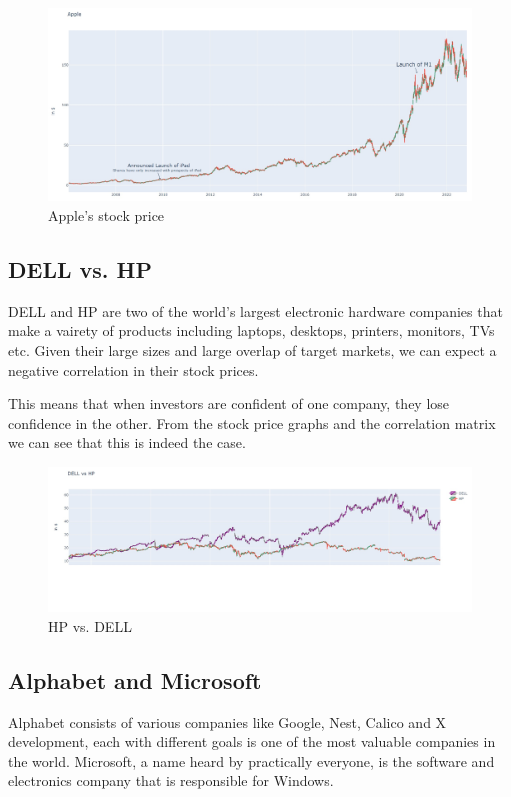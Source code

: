 \documentclass[11pt, twocolumn]{article}
\begin{document}
\begin{justify}
\begin{figure}[h]
  \centering
  \includegraphics[scale=0.24]{figs/apple.jpg}
  \caption*{Apple's stock price}
\end{figure}

\subsection{DELL vs. HP}
DELL and HP are two of the world's largest electronic hardware companies that make a vairety of products including laptops, desktops, printers, monitors, TVs etc.
Given their large sizes and large overlap of target markets, we can expect a negative correlation in their stock prices.
\vspace{1em}


This means that when investors are confident of one company, they lose confidence in the other. From the stock price graphs and the correlation matrix we can see that this is indeed the case.
\vspace{-5pt}

\begin{figure}[h]
  \centering
  \includegraphics[scale=0.24]{figs/hpdell.jpg}
  \caption*{HP vs. DELL}
\end{figure}

\subsection{Alphabet and Microsoft}
Alphabet consists of various companies like Google, Nest, Calico and X development, each with different goals is one of the most valuable companies in the world. Microsoft,
a name heard by practically everyone, is the software and electronics company that is responsible for Windows.
\vspace{1em}


\end{justify}
\end{document}
